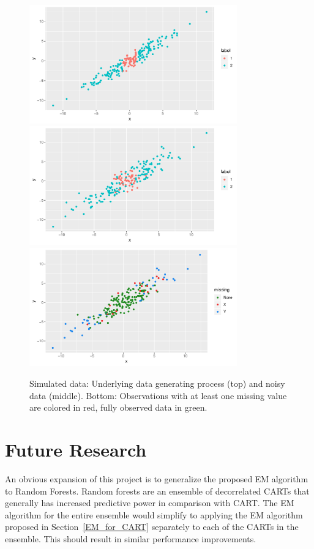 \documentclass[12pt, twoside]{article}
\newcommand{\1}{\mathbb{1}}
\begin{document}
\begin{figure}[hp]
	\centering
	\includegraphics[width=0.8\textwidth]{plots/dat_underlying.pdf}
    \includegraphics[width=0.8\textwidth]{plots/dat.pdf}
    \includegraphics[width=0.8\textwidth]{plots/dat_MAR.pdf}
	\caption{Simulated data: Underlying data generating process (top) and noisy data (middle). Bottom: Observations with at least one missing value are colored in red, fully observed data in green.}
	\label{fig:simu_data}
\end{figure}


\section{Future Research}
An obvious expansion of this project is to generalize the proposed EM algorithm to Random Forests. Random forests are an ensemble of decorrelated CARTs \citep{breiman} that generally has increased predictive power in comparison with CART.
The EM algorithm for the entire ensemble would simplify to applying the EM algorithm proposed in Section~\ref{EM_for_CART} separately to each of the CARTs in the ensemble. This should result in similar performance improvements.



\clearpage
 
{}

\end{document}

